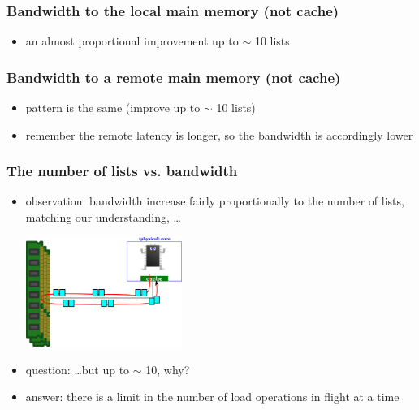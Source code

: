 \documentclass[12pt,dvipdfmx]{beamer}
\newcommand{\ao}[1]{{\color{blue}#1}}
\begin{document}
\begin{frame}[fragile]
\frametitle{Bandwidth to the local main memory (not cache)}
\begin{itemize}
\item an almost proportional improvement up to $\sim$ 10 lists
\end{itemize}
\begin{center}
{\scriptsize}
\end{center}
\end{frame}

\begin{frame}[fragile]
\frametitle{Bandwidth to a remote main memory (not cache)}
\begin{itemize}
\item pattern is the same (improve up to $\sim$ 10 lists)
\item remember the remote latency is longer, so the bandwidth is
  accordingly lower
\end{itemize}
\begin{center}
  {\scriptsize}
\end{center}
\end{frame}

\begin{frame}
\frametitle{The number of lists vs. bandwidth}
\begin{itemize}
\item<1-> \ao{observation:} 
  bandwidth increase fairly proportionally to the number of lists,
  matching our understanding, \ldots
\begin{center}
\includegraphics[width=0.4\textwidth]{out/pdf/svg/latency_very_large_2.pdf}
\end{center}
\item<2-> \ao{question:} \ldots but up to $\sim$ 10, why?
\item<3-> \ao{answer:} there is a limit in the number of 
  load operations in flight at a time
\end{itemize}
\end{frame}
\end{document}
